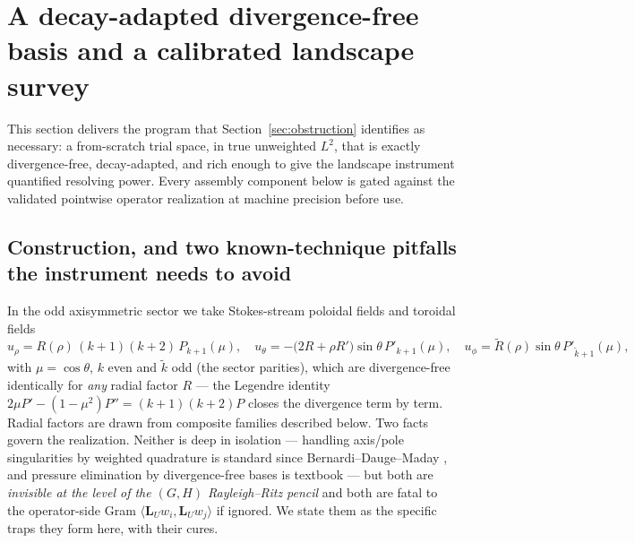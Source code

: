 \documentclass[11pt]{article}
\newcommand{\LU}{\mathbf{L}_{U}}
\theoremstyle{plain}
\theoremstyle{remark}
\begin{document}
\section{A decay-adapted divergence-free basis and a calibrated
landscape survey}\label{sec:rebuild}

This section delivers the program that Section~\ref{sec:obstruction}
identifies as necessary: a from-scratch trial space, in true unweighted
$L^2$, that is exactly divergence-free, decay-adapted, and rich enough
to give the landscape instrument quantified resolving power. Every
assembly component below is gated against the validated pointwise
operator realization at machine precision before use.

\subsection{Construction, and two known-technique pitfalls the instrument needs to avoid}
\label{sec:basisconstruction}
In the odd axisymmetric sector we take Stokes-stream poloidal fields
and toroidal fields
\begin{equation}\label{eq:stokes}
u_\rho = R(\rho)\,(k{+}1)(k{+}2)\,P_{k+1}(\mu),\quad
u_\theta = -\bigl(2R + \rho R'\bigr)\sin\theta\,P'_{k+1}(\mu),\quad
u_\phi = \tilde R(\rho)\sin\theta\,P'_{\tilde k+1}(\mu),
\end{equation}
with $\mu = \cos\theta$, $k$ even and $\tilde k$ odd (the sector
parities), which are divergence-free identically for \emph{any} radial
factor $R$ --- the Legendre identity
$2\mu P' - (1-\mu^2)P'' = (k{+}1)(k{+}2)P$ closes the divergence term
by term. Radial factors are drawn from composite families described
below. Two facts govern the realization. Neither is deep in isolation
--- handling axis/pole singularities by weighted quadrature is standard
since Bernardi--Dauge--Maday \cite{BDM99}, and pressure elimination by
divergence-free bases is textbook --- but both are \emph{invisible at
the level of the $(G,H)$ Rayleigh--Ritz pencil} and both are fatal to
the operator-side Gram $\langle \LU w_i,\LU w_j\rangle$ if ignored. We
state them as the specific traps they form here, with their cures.
\end{document}
